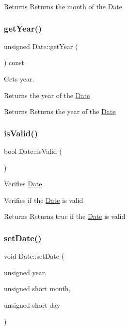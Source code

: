 \begin{DoxyReturn}{Returns}
Returns the month of the \hyperlink{class_date}{Date} 
\end{DoxyReturn}
\mbox{\label{class_date_aa1e4066bffc24af79f604dabce27e3cc}} 
\subsubsection{\texorpdfstring{get\+Year()}{getYear()}}
{\footnotesize\ttfamily unsigned Date\+::get\+Year (\begin{DoxyParamCaption}{ }\end{DoxyParamCaption}) const}



Gets year. 

Returns the year of the \hyperlink{class_date}{Date}

\begin{DoxyReturn}{Returns}
Returns the year of the \hyperlink{class_date}{Date} 
\end{DoxyReturn}
\mbox{\label{class_date_a7d9aaa9db591413e21c8b85fdae130ad}} 
\subsubsection{\texorpdfstring{is\+Valid()}{isValid()}}
{\footnotesize\ttfamily bool Date\+::is\+Valid (\begin{DoxyParamCaption}{ }\end{DoxyParamCaption})}



Verifies \hyperlink{class_date}{Date}. 

Verifies if the \hyperlink{class_date}{Date} is valid

\begin{DoxyReturn}{Returns}
Returns true if the \hyperlink{class_date}{Date} is valid 
\end{DoxyReturn}
\mbox{\label{class_date_a8c5fc0dd7ecf3bae6a1de5146fc566e4}} 
\subsubsection{\texorpdfstring{set\+Date()}{setDate()}}
{\footnotesize\ttfamily void Date\+::set\+Date (\begin{DoxyParamCaption}\item[{unsigned}]{year,  }\item[{unsigned short}]{month,  }\item[{unsigned short}]{day }\end{DoxyParamCaption})}



